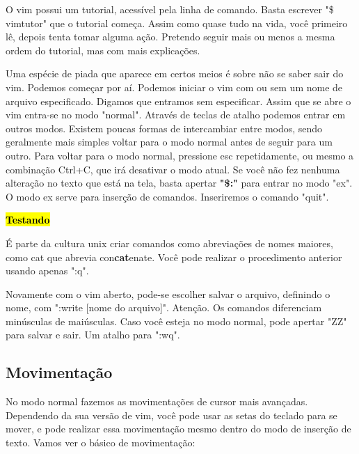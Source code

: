 \documentclass[a4paper, 12pt]{article}
\begin{document}
O vim possui um tutorial, acessível pela linha de comando.
Basta escrever "\$ vimtutor" que o tutorial começa.
Assim como quase tudo na vida, você primeiro lê, depois tenta tomar alguma ação.
Pretendo seguir mais ou menos a mesma ordem do tutorial, mas com mais explicações.

Uma espécie de piada que aparece em certos meios é sobre não se saber sair do vim.
Podemos começar por aí.
Podemos iniciar o vim com ou sem um nome de arquivo especificado.
Digamos que entramos sem especificar.
Assim que se abre o vim entra-se no modo "normal".
Através de teclas de atalho podemos entrar em outros modos.
Existem poucas formas de intercambiar entre modos, sendo geralmente mais simples voltar para o modo normal antes de seguir para um outro.
Para voltar para o modo normal, pressione esc repetidamente, ou mesmo a combinação Ctrl+C, que irá desativar o modo atual.
Se você não fez nenhuma alteração no texto que está na tela, basta apertar \textbf{"\$:"} para entrar no modo "ex".
O modo ex serve para inserção de comandos.
Inseriremos o comando "quit".

\textbf{
\textcolor{white}{
    \hl{Testando}
}}

 
É parte da cultura unix criar comandos como abreviações de nomes maiores, como cat que abrevia con\textbf{cat}enate.
Você pode realizar o procedimento anterior usando apenas ":q".

Novamente com o vim aberto, pode-se escolher salvar o arquivo, definindo o nome, com ":write [nome do arquivo]".
Atenção. Os comandos diferenciam minúsculas de maiúsculas.
Caso você esteja no modo normal, pode apertar "ZZ" para salvar e sair. Um atalho para ":wq".


\subsection{Movimentação}
No modo normal fazemos as movimentações de cursor mais avançadas.
Dependendo da sua versão de vim, você pode usar as setas do teclado para se mover, e pode realizar essa movimentação mesmo dentro do modo de inserção de texto.
Vamos ver o básico de movimentação:
\end{document}
